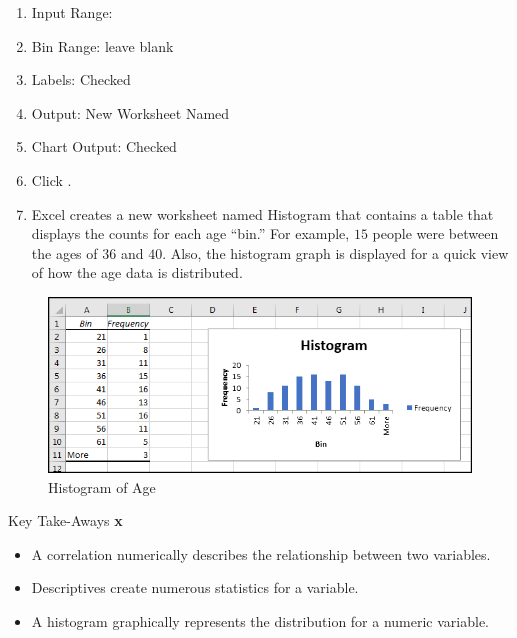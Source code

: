 \begin{enumerate}[resume]
	\item Input Range: 
	\item Bin Range: leave blank
	\item Labels: Checked
	\item Output: New Worksheet Named 
	\item Chart Output: Checked
	\item Click .
	\item Excel creates a new worksheet named Histogram that contains a table that displays the counts for each age ``bin.'' For example, $ 15 $ people were between the ages of $ 36 $ and $ 40 $. Also, the histogram graph is displayed for a quick view of how the age data is distributed.
\end{enumerate}

\begin{figure}[H]
	\centering
	\includegraphics[width=\maxwidth{.95\linewidth}]{gfx/ch09_fig63}
	\caption{Histogram of Age}
	\label{09:fig63}
\end{figure}

\begin{center}
	\begin{tkwbox}{Key Take-Aways}
		\textbf{x}
		\\
		\begin{itemize}
			\setlength{\itemsep}{0pt}
			\setlength{\parskip}{0pt}
			\setlength{\parsep}{0pt}
			
			\item A correlation numerically describes the relationship between two variables.
			\item Descriptives create numerous statistics for a variable.
			\item A histogram graphically represents the distribution for a numeric variable.
			
		\end{itemize}
	\end{tkwbox}
\end{center}

